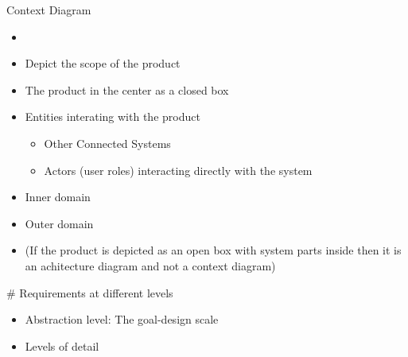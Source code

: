 
\begin{Slide}{Context Diagram}

\begin{itemize}
\item \TODO{}
\item Depict the scope of the product
\item The product in the center as a closed box
\item Entities interating with the product
\begin{itemize}
\item Other Connected Systems
\item Actors (user roles) interacting directly with the system
\end{itemize}
\item Inner domain
\item Outer domain
\item (If the product is depicted as an open box with system parts inside then it is an achitecture diagram and not a context diagram)


\end{itemize}
# Requirements at different levels

\begin{itemize}
\item Abstraction level: The goal-design scale
\item Levels of detail
\end{itemize}
\end{Slide}
